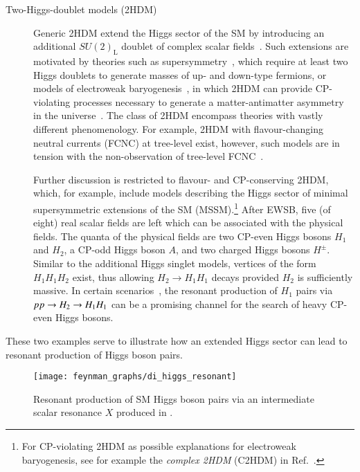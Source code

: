 \begin{description}
\item[Two-Higgs-doublet models (2HDM)] Generic 2HDM extend the Higgs sector of
  the SM by introducing an additional $SU(2)_{\text{L}}$ doublet of complex
  scalar fields~\cite{Gunion:1989we,Branco:2011iw}. Such extensions are
  motivated by theories such as supersymmetry~\cite{Haber:1984rc}, which require
  at least two Higgs doublets to generate masses of up- and down-type fermions,
  or models of electroweak baryogenesis~\cite{Trodden:1998ym}, in which 2HDM can
  provide CP-violating processes necessary to generate a matter-antimatter
  asymmetry in the universe~\cite{Sakharov:1967dj}. The class of 2HDM encompass
  theories with vastly different phenomenology. For example, 2HDM with
  flavour-changing neutral currents (FCNC) at tree-level exist, however, such
  models are in tension with the non-observation of tree-level
  FCNC~\cite{Gunion:1989we,Branco:2011iw}.

  Further discussion is restricted to flavour- and CP-conserving 2HDM, which,
  for example, include models describing the Higgs sector of minimal
  supersymmetric extensions of the SM (MSSM).\footnote{For CP-violating 2HDM as
    possible explanations for electroweak baryogenesis, see for example the
    \emph{complex 2HDM} (C2HDM) in Ref.~\cite{Fontes:2017zfn}.}
  After EWSB, five (of eight) real scalar fields are left which can be
  associated with the physical fields. The quanta of the physical fields are two
  CP-even Higgs bosons $H_1$ and $H_2$, a CP-odd Higgs boson $A$, and two
  charged Higgs bosons $H^\pm$. Similar to the additional Higgs singlet models,
  vertices of the form $H_1 H_1 H_2$ exist, thus allowing $H_2 \to H_1 H_1$
  decays provided $H_2$ is sufficiently massive. In certain
  scenarios~\cite{Djouadi:2013vqa,Djouadi:2013uqa}, the resonant production of
  $H_1$ pairs via $pp \to H_2 \to H_1 H_1$ can be a promising channel for the
  search of heavy CP-even Higgs bosons.
\end{description}
These two examples serve to illustrate how an extended Higgs sector can lead to
resonant production of Higgs boson pairs.



\begin{figure}[htbp]
  \centering

  \texttt{[image: feynman\_graphs/di\_higgs\_resonant]}

  \caption{Resonant production of SM Higgs boson pairs via an intermediate
    scalar resonance $X$ produced in \ggF.}%
  \label{fig:resonant_production_feyn}
\end{figure}

